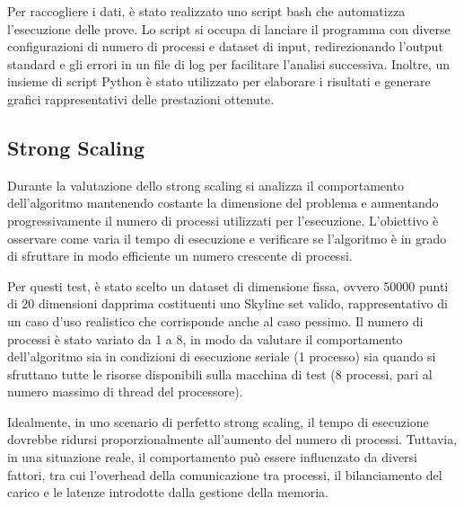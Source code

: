 \documentclass[letterpaper,11pt,leqno]{article}
\begin{document}
Per raccogliere i dati, è stato realizzato uno script bash che automatizza l'esecuzione delle prove. Lo script si occupa di lanciare il programma con diverse configurazioni di numero di processi e dataset di input, redirezionando l'output standard e gli errori in un file di log per facilitare l'analisi successiva. Inoltre, un insieme di script Python è stato utilizzato per elaborare i risultati e generare grafici rappresentativi delle prestazioni ottenute.  

\subsection{Strong Scaling}

Durante la valutazione dello strong scaling si analizza il comportamento dell'algoritmo mantenendo costante la dimensione del problema e aumentando progressivamente il numero di processi utilizzati per l'esecuzione. L'obiettivo è osservare come varia il tempo di esecuzione e verificare se l'algoritmo è in grado di sfruttare in modo efficiente un numero crescente di processi.  

Per questi test, è stato scelto un dataset di dimensione fissa, ovvero 50000 punti di 20 dimensioni dapprima costituenti uno Skyline set valido, rappresentativo di un caso d'uso realistico che corrisponde anche al caso pessimo. Il numero di processi è stato variato da 1 a 8, in modo da valutare il comportamento dell'algoritmo sia in condizioni di esecuzione seriale (1 processo) sia quando si sfruttano tutte le risorse disponibili sulla macchina di test (8 processi, pari al numero massimo di thread del processore).  

Idealmente, in uno scenario di perfetto strong scaling, il tempo di esecuzione dovrebbe ridursi proporzionalmente all'aumento del numero di processi. Tuttavia, in una situazione reale, il comportamento può essere influenzato da diversi fattori, tra cui l'overhead della comunicazione tra processi, il bilanciamento del carico e le latenze introdotte dalla gestione della memoria. 
\end{document}
